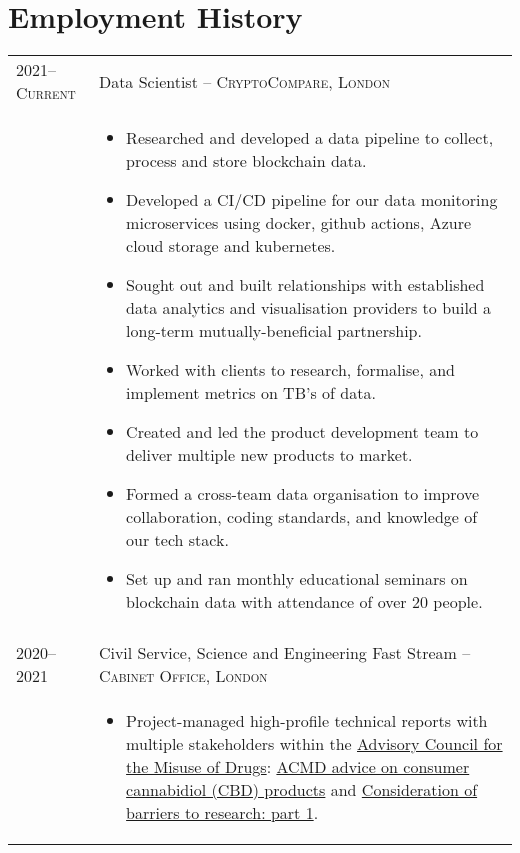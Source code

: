 \documentclass[a4paper,10pt]{article}
\begin{document}
\section{Employment History}
\begin{tabular}{p{2.25cm}|p{15cm}}
%
%
	\textsc{2021--Current} & \large{Data Scientist -- \textsc{CryptoCompare, London}}\\
	 & \vspace{-0.07 in}\begin{itemize}
	 	\item Researched and developed a data pipeline to collect, process and store blockchain data.
		\item Developed a CI/CD pipeline for our data monitoring microservices using docker, github actions, Azure cloud storage and kubernetes.
		\item Sought out and built relationships with established data analytics and visualisation providers to build a long-term mutually-beneficial partnership.
		\item Worked with clients to research, formalise, and implement metrics on TB's of data.
		\item Created and led the product development team to deliver multiple new products to market.
		\item Formed a cross-team data organisation to improve collaboration, coding standards, and knowledge of our tech stack.
		\item Set up and ran monthly educational seminars on blockchain data with attendance of over 20 people.
	\end{itemize}\vspace{-0.15 in}\\
\multicolumn{2}{c}{}\\
%
%
	\textsc{2020--2021} & \large{Civil Service, Science and Engineering Fast Stream -- \textsc{Cabinet Office, London}}\\
 	 & \vspace{-0.07 in}\begin{itemize}
 	 	\item Project-managed high-profile technical reports with multiple stakeholders within the \href{https://www.gov.uk/government/organisations/advisory-council-on-the-misuse-of-drugs}{Advisory Council for the Misuse of Drugs}: \href{https://www.gov.uk/government/publications/acmd-advice-on-consumer-cannabidiol-cbd-products}{ACMD advice on consumer cannabidiol (CBD) products} and \href{https://www.gov.uk/government/publications/consideration-of-barriers-to-research-part-1}{Consideration of barriers to research: part 1}.

\end{itemize}
\end{tabular}
\end{document}
